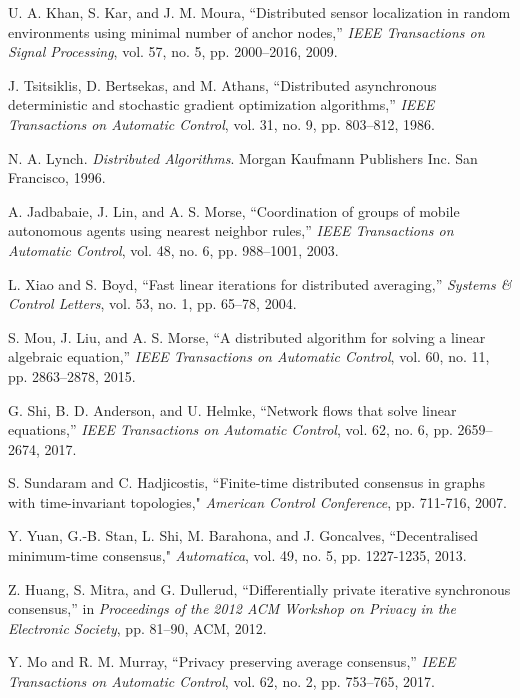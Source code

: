 \documentclass[a4paper, 11pt]{article}
\newcommand{\1}{\mathbf{1}}
\begin{document}
\begin{thebibliography}{1}
U. A. Khan, S. Kar, and J. M. Moura, ``Distributed sensor localization in
random environments using minimal number of anchor nodes,'' {\em IEEE
	Transactions on Signal Processing}, vol. 57, no. 5, pp. 2000--2016, 2009.

J. Tsitsiklis, D. Bertsekas, and M. Athans, ``Distributed asynchronous
deterministic and stochastic gradient optimization algorithms,'' \emph{IEEE
	Transactions on Automatic Control}, vol. 31, no. 9, pp. 803--812, 1986.

 N. A. Lynch. {\em Distributed Algorithms}. Morgan Kaufmann Publishers Inc. San Francisco, 1996.	



A. Jadbabaie, J. Lin, and A. S. Morse, ``Coordination of groups of mobile
autonomous agents using nearest neighbor rules,'' \emph{IEEE Transactions on
	Automatic Control}, vol. 48, no. 6, pp. 988--1001, 2003.

L. Xiao and S. Boyd, ``Fast linear iterations for distributed averaging,''
\emph{Systems \& Control Letters}, vol. 53, no. 1, pp. 65--78, 2004.

S. Mou, J. Liu, and A. S. Morse, ``A distributed algorithm for solving a linear
algebraic equation,'' \emph{IEEE Transactions on Automatic Control}, vol. 60,
no. 11, pp. 2863--2878, 2015.

G. Shi, B. D. Anderson, and U. Helmke, ``Network flows that solve linear
equations,'' \emph{IEEE Transactions on Automatic Control}, vol. 62, no. 6,
pp. 2659--2674, 2017.

 S. Sundaram and C. Hadjicostis, ``Finite-time distributed consensus in
graphs with time-invariant topologies," {\em American Control Conference},  pp. 711-716, 2007.

 Y. Yuan, G.-B. Stan, L. Shi, M. Barahona, and J. Goncalves, ``Decentralised
minimum-time consensus," {\em Automatica}, vol. 49, no. 5, pp. 1227-1235,
2013.


Z. Huang, S. Mitra, and G. Dullerud, ``Differentially private iterative
synchronous consensus,'' in {\em Proceedings of the 2012 ACM Workshop on
	Privacy in the Electronic Society}, pp. 81--90, ACM, 2012.

Y. Mo and R. M. Murray, ``Privacy preserving average consensus,'' {\em IEEE
	Transactions on Automatic Control}, vol. 62, no. 2, pp. 753--765, 2017.


\end{thebibliography}
\end{document}
